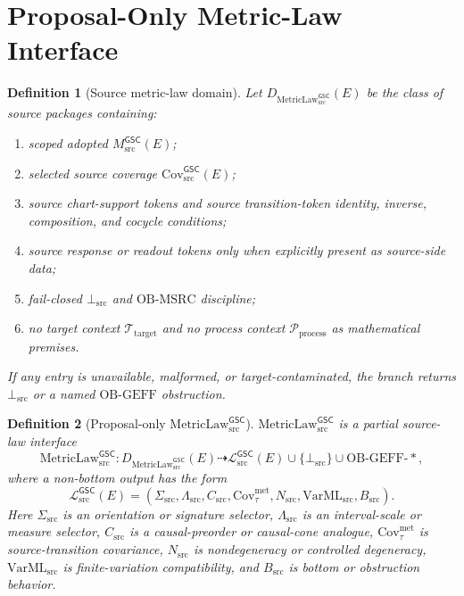 \documentclass[11pt]{article}
\newcommand{\MsrcGSC}{M_{\mathrm{src}}^{\mathsf{GSC}}}
\newcommand{\CovSrc}{\mathrm{Cov}_{\mathrm{src}}^{\mathsf{GSC}}}
\newcommand{\MetricLaw}{\mathrm{MetricLaw}_{\mathrm{src}}^{\mathsf{GSC}}}
\newcommand{\MetricData}{\mathcal{L}_{\mathrm{src}}^{\mathsf{GSC}}}
\newcommand{\BottomSrc}{\bot_{\mathrm{src}}}
\newcommand{\TargetCtx}{\mathcal{T}_{\mathrm{target}}}
\newcommand{\ProcCtx}{\mathcal{P}_{\mathrm{process}}}
\newtheorem{definition}{Definition}
\begin{document}
\section{Proposal-Only Metric-Law Interface}

\begin{definition}[Source metric-law domain]
Let \(D_{\MetricLaw}(E)\) be the class of source packages containing:
\begin{enumerate}[leftmargin=*]
  \item scoped adopted \(\MsrcGSC(E)\);
  \item selected source coverage \(\CovSrc(E)\);
  \item source chart-support tokens and source transition-token identity,
  inverse, composition, and cocycle conditions;
  \item source response or readout tokens only when explicitly present as
  source-side data;
  \item fail-closed \(\BottomSrc\) and \(\mathrm{OB\mbox{-}MSRC}\) discipline;
  \item no target context \(\TargetCtx\) and no process context
  \(\ProcCtx\) as mathematical premises.
\end{enumerate}
If any entry is unavailable, malformed, or target-contaminated, the branch
returns \(\BottomSrc\) or a named \(\mathrm{OB\mbox{-}GEFF}\) obstruction.
\end{definition}

\begin{definition}[Proposal-only \(\MetricLaw\)]
\(\MetricLaw\) is a partial source-law interface
\[
  \MetricLaw:
  D_{\MetricLaw}(E)
  \dashrightarrow
  \MetricData(E)
  \cup
  \{\BottomSrc\}
  \cup
  \mathrm{OB\mbox{-}GEFF\mbox{-}*},
\]
where a non-bottom output has the form
\[
  \MetricData(E)
  =
  (
    \Sigma_{\mathrm{src}},
    \Lambda_{\mathrm{src}},
    C_{\mathrm{src}},
    \mathrm{Cov}_{\tau}^{\mathrm{met}},
    N_{\mathrm{src}},
    \mathrm{VarML}_{\mathrm{src}},
    B_{\mathrm{src}}
  ).
\]
Here \(\Sigma_{\mathrm{src}}\) is an orientation or signature selector,
\(\Lambda_{\mathrm{src}}\) is an interval-scale or measure selector,
\(C_{\mathrm{src}}\) is a causal-preorder or causal-cone analogue,
\(\mathrm{Cov}_{\tau}^{\mathrm{met}}\) is source-transition covariance,
\(N_{\mathrm{src}}\) is nondegeneracy or controlled degeneracy,
\(\mathrm{VarML}_{\mathrm{src}}\) is finite-variation compatibility, and
\(B_{\mathrm{src}}\) is bottom or obstruction behavior.
\end{definition}
\end{document}
